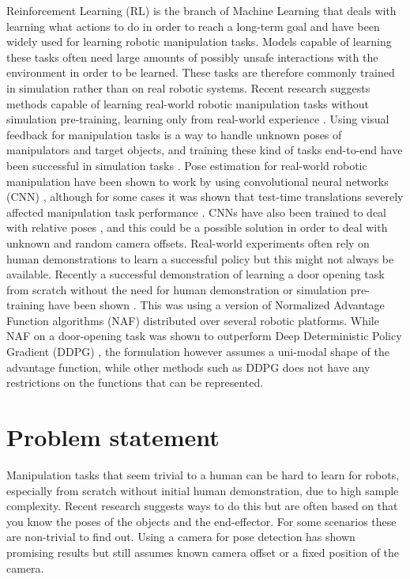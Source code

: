 Reinforcement Learning (RL) is the branch of Machine Learning that deals with
learning what actions to do in order to reach a long-term goal and have been
widely used for learning robotic manipulation tasks. Models capable of learning
these tasks often need large amounts of possibly unsafe interactions with the
environment in order to be learned. These tasks are therefore commonly trained
in simulation rather than on real robotic systems. Recent research suggests
methods capable of learning real-world robotic manipulation tasks without
simulation pre-training, learning only from real-world experience
\cite{yahya2016collective,gu2016deep,finn2016deep,chebotar2016path}. Using
visual feedback for manipulation tasks is a way to handle unknown poses of
manipulators and target objects, and training these kind of tasks end-to-end
have been successful in simulation tasks
\cite{schulman2015trust,lillicrap2015continuous}. Pose estimation for
real-world robotic manipulation have been shown to work by using convolutional
neural networks (CNN)
\cite{levine2016end,chebotar2016path,yahya2016collective}, although for some
cases it was shown that test-time translations severely affected manipulation
task performance \cite{yahya2016collective}. CNNs have also been trained to
deal with relative poses \cite{park20163d}, and this could be a possible
solution in order to deal with unknown and random camera offsets. Real-world
experiments often rely on human demonstrations to learn a successful policy but
this might not always be available. Recently a successful demonstration of
learning a door opening task from scratch without the need for human
demonstration or simulation pre-training have been shown \cite{gu2016deep}.
This was using a version of Normalized Advantage Function algorithms (NAF)
\cite{gu2016continuous} distributed over several robotic platforms. While NAF
on a door-opening task was shown to outperform Deep Deterministic Policy
Gradient (DDPG) \cite{gu2016deep,lillicrap2015continuous}, the formulation
however assumes a uni-modal shape of the advantage function, while other
methods such as DDPG does not have any restrictions on the functions that can
be represented.

\section{Problem statement}

Manipulation tasks that seem trivial to a human can be hard to learn for
robots, especially from scratch without initial human demonstration, due to
high sample complexity. Recent research suggests ways to do this but are often
based on that you know the poses of the objects and the end-effector. For some
scenarios these are non-trivial to find out. Using a camera for pose detection
has shown promising results but still assumes known camera offset or a fixed
position of the camera.

